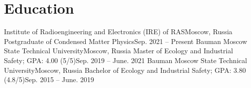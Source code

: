 

\section{Education}\label{sec:education}
\resumeSubHeadingListStart
\resumeSubheading
{Institute of Radioengineering and Electronics (IRE) of RAS}{Moscow, Russia}
{Postgraduate of Condensed Matter Physics}{Sep. 2021 -- Present}
\resumeSubheading
{Bauman Moscow State Technical University}{Moscow, Russia}
{Master of Ecology and Industrial Safety; GPA: 4.00 (5/5)}{Sep. 2019 -- June. 2021}
\resumeSubheading
{Bauman Moscow State Technical University}{Moscow, Russia}
{Bachelor of Ecology and Industrial Safety; GPA: 3.80 (4.8/5)}{Sep. 2015 -- June. 2019}
\resumeSubHeadingListEnd